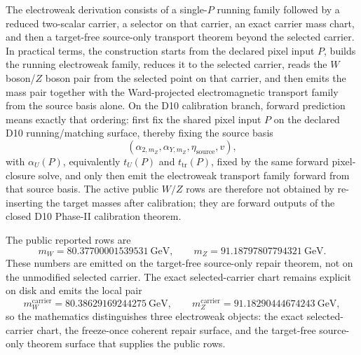 \documentclass[11pt]{article}
\begin{document}
The electroweak derivation consists of a single-\(P\) running family followed by a
reduced two-scalar carrier, a selector on that carrier, an exact carrier mass chart, and
then a target-free source-only transport theorem beyond the selected carrier. In practical terms, the construction starts from
the declared pixel input \(P\), builds the running electroweak family, reduces it to the selected
carrier, reads the \(W\) boson/\(Z\) boson pair from the selected point on that carrier,
and then emits the mass pair together with the Ward-projected electromagnetic transport family from
the source basis alone.
On the D10 calibration branch, forward prediction means exactly that ordering: first fix the shared pixel input \(P\) on the
declared D10 running/matching surface, thereby fixing the source basis
\[
(\alpha_{2,m_Z},\alpha_{Y,m_Z},\eta_{\mathrm{source}},v),
\]
with \(\alpha_U(P)\), equivalently \(t_U(P)\) and \(t_{\mathrm{tr}}(P)\), fixed by the
same forward pixel-closure solve,
and only then emit the electroweak transport family forward from that source basis. The
active public \(W/Z\) rows are therefore not obtained by re-inserting the target masses after
calibration; they are forward outputs of the closed D10 Phase-II calibration theorem.

The public reported rows are
\[
m_W = 80.37700001539531~\mathrm{GeV},
\qquad
m_Z = 91.18797807794321~\mathrm{GeV}.
\]
These numbers are emitted on the target-free source-only repair theorem, not on the unmodified
selected carrier. The exact selected-carrier chart remains explicit on disk and emits
the local pair
\[
m_W^{\mathrm{carrier}} = 80.38629169244275~\mathrm{GeV},
\qquad
m_Z^{\mathrm{carrier}} = 91.18290444674243~\mathrm{GeV},
\]
so the mathematics distinguishes three electroweak objects: the exact selected-carrier chart, the
freeze-once coherent repair surface, and the target-free source-only theorem surface that supplies
the public rows.
\end{document}
